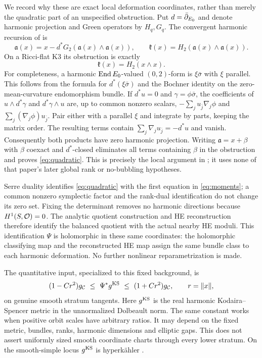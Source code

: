 We record why these are exact local deformation coordinates, rather
than merely the quadratic part of an unspecified obstruction. Put
$d=\bar\partial_{E_0}$ and denote harmonic projection and Green operators
by $H_q,G_q$. The convergent harmonic recursion of
\cite[Lemma~2.1]{wuebben15} is
\begin{equation}\label{eq:recursion}
 \mathfrak a(x)=x-d^*G_2(\mathfrak a(x)\wedge\mathfrak a(x)),\qquad
 \mathfrak k(x)=H_2(\mathfrak a(x)\wedge\mathfrak a(x)).
\end{equation}
On a Ricci-flat K3 its obstruction is exactly
\begin{equation}\label{eq:quadratic}
 \mathfrak k(x)=H_2(x\wedge x).
\end{equation}
For completeness, a harmonic $\operatorname{End} E_0$-valued $(0,2)$-form is
$\xi\bar\sigma$ with $\xi$ parallel. This follows from the formula
for $d^*(\xi\bar\sigma)$ and the Bochner identity on the
zero-mean-curvature endomorphism bundle. If $d^*u=0$ and
$\gamma=\phi\bar\sigma$, the coefficients of
$u\wedge d^*\gamma$ and $d^*\gamma\wedge u$ are, up to common
nonzero scalars,
$-\sum_j u_{\bar j}\nabla_j\phi$ and
$\sum_j(\nabla_j\phi)u_{\bar j}$. Pair either with a parallel
$\xi$ and integrate by parts, keeping the matrix order. The resulting
terms contain $\sum_j\nabla_j u_{\bar j}=-d^*u$ and vanish.
Consequently both products have zero harmonic projection.
Writing $\mathfrak a=x+\beta$ with $\beta$ coexact and
$d^*$-closed eliminates all terms containing $\beta$ in the
obstruction and proves \eqref{eq:quadratic}. This is precisely the
local argument in \cite[Lemma~3.1]{wuebben20}; it uses none of that
paper's later global rank or no-bubbling hypotheses.

Serre duality identifies \eqref{eq:quadratic} with the first equation
in \eqref{eq:moments}; a common nonzero symplectic factor and the
rank-dual identification do not change its zero set. Fixing the
determinant removes no harmonic directions because $H^1(S,\mathcal O)=0$.
The analytic quotient construction \cite{buchdahl} and HE reconstruction
\cite[Theorem~1.1]{wuebben15} therefore identify the balanced quotient
with the actual nearby HE moduli. This identification $\Psi$ is
holomorphic in these same coordinates: the holomorphic classifying
map and the reconstructed HE map assign the same bundle class to
each harmonic deformation. No further nonlinear reparametrization
is made.

The quantitative input, specialized to this fixed background, is
\begin{equation}\label{eq:metriccomparison}
 (1-Cr^2)g_{\mathcal C}\ \le\ \Psi^*g^{\mathrm{KS}}\ \le\ (1+Cr^2)g_{\mathcal C},
 \qquad r=\|x\|,
\end{equation}
on genuine smooth stratum tangents. Here $g^{\mathrm{KS}}$ is the real harmonic
Kodaira--Spencer metric in the unnormalized Dolbeault norm. The same
constant works when positive orbit scales have arbitrary ratios. It
may depend on the fixed metric, bundles, ranks, harmonic dimensions
and elliptic gaps. This does not assert uniformly sized smooth
coordinate charts through every lower stratum. On the smooth-simple
locus $g^{\mathrm{KS}}$ is hyperk\"ahler \cite{itoh}.


